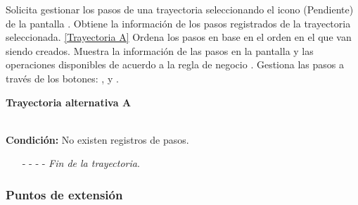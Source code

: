 \begin{UCtrayectoria}
	\UCpaso[\UCactor] Solicita gestionar los pasos de una trayectoria seleccionando el icono (Pendiente) de la pantalla .
	\UCpaso[\UCsist] Obtiene la información de los pasos registrados de la trayectoria seleccionada. \hyperlink{CU12-1-1-1-1:TAA}{[Trayectoria A]}
	\UCpaso[\UCsist] Ordena los pasos en base en el orden en el que van siendo creados.
	\UCpaso[\UCsist] Muestra la información de las pasos en la pantalla  y las operaciones disponibles de acuerdo a la regla de negocio . \label{CU12-1-1-1-1-P4}
	\UCpaso[\UCactor] Gestiona las pasos a través de los botones: , \editar y \eliminar. 
\end{UCtrayectoria}		
\hypertarget{CU12-1-1-1-1:TAA}{\textbf{Trayectoria alternativa A}}\\
\noindent \textbf{Condición:} No existen registros de pasos.
\begin{enumerate}
	\UCpaso[\UCsist] Muestra el mensaje  en la pantalla  para indicar que no hay registros de pasos para mostrar.  \label{CU12-1-1-1-1-TA1}
	\UCpaso[\UCactor] Gestiona las pasos a través del botón: . 
	\item[- -] - - {\em {Fin de la trayectoria}}.%
\end{enumerate}
\subsubsection{Puntos de extensión}

